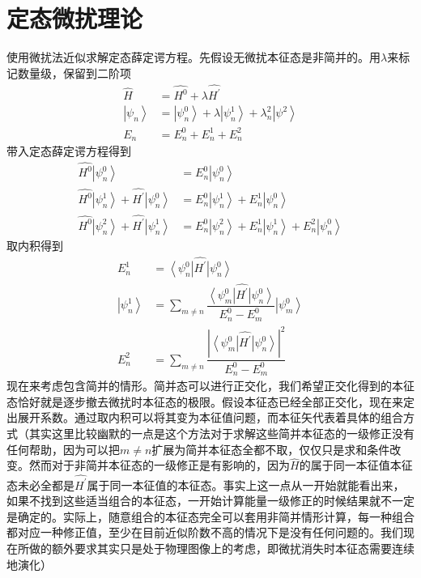\documentclass[12pt, a4paper, oneside]{ctexart}
\begin{document}
	\section{定态微扰理论}
	使用微扰法近似求解定态薛定谔方程。先假设无微扰本征态是非简并的。用$\lambda$来标记数量级，保留到二阶项
	\begin{align}
		\hat{H}&=\hat{H^{0}}+\lambda\hat{H^{\prime}}\\
		\left|\psi_{n}\right>&=\left|\psi^{0}_{n}\right>+\lambda\left|\psi^{1}_{n}\right>+\lambda^{2}_{n}\left|\psi^{2}\right>\\
		E_{n}&=E_{n}^{0}+E_{n}^{1}+E_{n}^{2}
	\end{align}
	\quad\quad 带入定态薛定谔方程得到
	\begin{align}
		\hat{H^{0}}\left|\psi_{n}^{0}\right>&=E_{n}^{0}\left|\psi_{n}^{0}\right>\\
		\hat{H^{0}}\left|\psi_{n}^{1}\right>+\hat{H^{\prime}}\left|\psi_{n}^{0}\right>&=E_{n}^{0}\left|\psi_{n}^{1}\right>+E_{n}^{1}\left|\psi_{n}^{0}\right>\\
		\hat{H^{0}}\left|\psi_{n}^{2}\right>+\hat{H^{\prime}}\left|\psi_{n}^{1}\right>&=E_{n}^{0}\left|\psi_{n}^{2}\right>+E_{n}^{1}\left|\psi_{n}^{1}\right>+E_{n}^{2}\left|\psi_{n}^{0}\right>
	\end{align}
	\quad\quad 取内积得到
	\begin{align}
		E_{n}^{1}&=\left<\psi_{n}^{0}\right|\hat{H^{\prime}}\left|\psi_{n}^{0}\right>\\
		\left|\psi_{n}^{1}\right>&=\sum_{m\ne n}\dfrac{\left<\psi_{m}^{0}\right|\hat{H^{\prime}}\left|\psi_{n}^{0}\right>}{E_{n}^{0}-E_{m}^{0}}\left|\psi_{m}^{0}\right>\\
		E_{n}^{2}&=\sum_{m\ne n}\dfrac{\left|\left<\psi_{m}^{0}\right|\hat{H^{\prime}}\left|\psi_{n}^{0}\right>\right|^{2}}{E_{n}^{0}-E_{m}^{0}}
	\end{align}
	\quad\quad 现在来考虑包含简并的情形。简并态可以进行正交化，我们希望正交化得到的本征态恰好就是逐步撤去微扰时本征态的极限。假设本征态已经全部正交化，现在来定出展开系数。通过取内积可以将其变为本征值问题，而本征矢代表着具体的组合方式（其实这里比较幽默的一点是这个方法对于求解这些简并本征态的一级修正没有任何帮助，因为可以把$m\ne n$扩展为简并本征态全都不取，仅仅只是求和条件改变。然而对于非简并本征态的一级修正是有影响的，因为$\hat{H}$的属于同一本征值本征态未必全都是$\hat{H^{\prime}}$属于同一本征值的本征态。事实上这一点从一开始就能看出来，如果不找到这些适当组合的本征态，一开始计算能量一级修正的时候结果就不一定是确定的。实际上，随意组合的本征态完全可以套用非简并情形计算，每一种组合都对应一种修正值，至少在目前近似阶数不高的情况下是没有任何问题的。我们现在所做的额外要求其实只是处于物理图像上的考虑，即微扰消失时本征态需要连续地演化）
\end{document}
